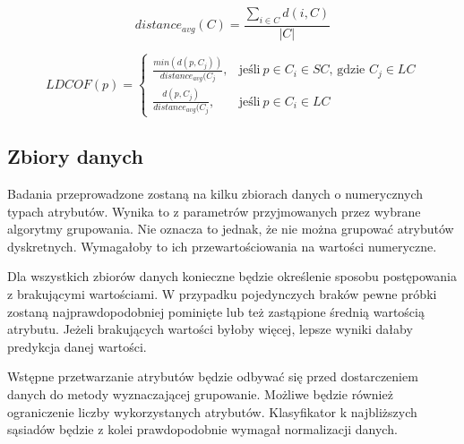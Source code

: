\documentclass[11pt,a4paper,twoside]{article}
\begin{document}
\begin{equation}
distance_{avg}(C) = \frac{\sum_{i \in C} d(i,C)}{|C|}
\end{equation}

\begin{equation}
LDCOF(p) = \begin{cases}
   \frac{min(d(p,C_{j}))}{distance_{avg}(C_{j}}, & \text{jeśli}\ p \in C_{i} \in SC \text{, gdzie } C_{j} \in LC\\
    \frac{d(p,C_{j})}{distance_{avg}(C_{j}}, & \text{jeśli}\ p \in C_{i} \in LC
  \end{cases}
\end{equation}


\subsection{Zbiory danych}

Badania przeprowadzone zostaną na kilku zbiorach danych o numerycznych typach atrybutów. Wynika to z parametrów przyjmowanych przez wybrane algorytmy grupowania. Nie oznacza to jednak, że nie można grupować atrybutów dyskretnych. Wymagałoby to ich przewartościowania na wartości numeryczne.

Dla wszystkich zbiorów danych konieczne będzie określenie sposobu postępowania z brakującymi wartościami. W przypadku pojedynczych braków pewne próbki zostaną najprawdopodobniej pominięte lub też zastąpione średnią wartością atrybutu. Jeżeli brakujących wartości byłoby więcej, lepsze wyniki dałaby predykcja danej wartości.

Wstępne przetwarzanie atrybutów będzie odbywać się przed dostarczeniem danych do metody wyznaczającej grupowanie. Możliwe będzie również ograniczenie liczby wykorzystanych atrybutów. Klasyfikator k najbliższych sąsiadów będzie z kolei prawdopodobnie wymagał normalizacji danych. 
\end{document}
